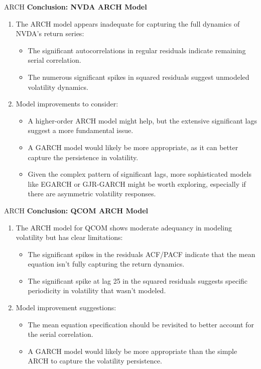 \documentclass{beamer}[9pt]
\begin{document}
\begin{frame}{ARCH}
	\textbf{Conclusion: NVDA ARCH Model}
	\begin{enumerate}
		\item The ARCH model appears inadequate for capturing the full dynamics of NVDA’s return series:
		\begin{itemize}
			\item The significant autocorrelations in regular residuals indicate remaining serial correlation.
			\item The numerous significant spikes in squared residuals suggest unmodeled volatility dynamics.
		\end{itemize}
		\item Model improvements to consider:
		\begin{itemize}
			\item A higher-order ARCH model might help, but the extensive significant lags suggest a more fundamental issue.
			\item A GARCH model would likely be more appropriate, as it can better capture the persistence in volatility.
			\item Given the complex pattern of significant lags, more sophisticated models like EGARCH or GJR-GARCH might be worth exploring, especially if there are asymmetric volatility responses.
		\end{itemize}
	\end{enumerate}
\end{frame}

\begin{frame}{ARCH}
	\textbf{Conclusion: QCOM ARCH Model}
	\begin{enumerate}
		\item The ARCH model for QCOM shows moderate adequancy in modeling volatility but has clear limitations:
		\begin{itemize}
			\item The significant spikes in the residuals ACF/PACF indicate that the mean equation isn’t fully capturing the return dynamics.
			\item The significant spike at lag 25 in the squared residuals suggests specific periodicity in volatility that wasn’t modeled.
		\end{itemize}
		\item Model improvement suggestions:
		\begin{itemize}
			\item The mean equation specification should be revisited to better account for the serial correlation.
			\item A GARCH model would likely be more appropriate than the simple ARCH to capture the volatility persistence.
		\end{itemize}
	\end{enumerate}
\end{frame}
\end{document}
